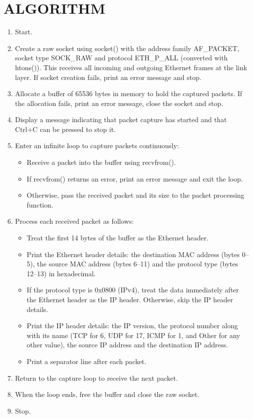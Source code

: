 \documentclass[12pt,a4paper]{article}
\begin{document}
	\section*{ALGORITHM}
\begin{enumerate}
	\item Start.
	\item Create a raw socket using socket() with the address family AF\_PACKET, socket type SOCK\_RAW and protocol ETH\_P\_ALL (converted with htons()). This receives all incoming and outgoing Ethernet frames at the link layer. If socket creation fails, print an error message and stop.
	\item Allocate a buffer of 65536 bytes in memory to hold the captured packets. If the allocation fails, print an error message, close the socket and stop.
	\item Display a message indicating that packet capture has started and that Ctrl+C can be pressed to stop it.
	\item Enter an infinite loop to capture packets continuously:
	\begin{itemize}
		\item Receive a packet into the buffer using recvfrom().
		\item If recvfrom() returns an error, print an error message and exit the loop.
		\item Otherwise, pass the received packet and its size to the packet processing function.
	\end{itemize}
	\item Process each received packet as follows:
	\begin{itemize}
		\item Treat the first 14 bytes of the buffer as the Ethernet header.
		\item Print the Ethernet header details: the destination MAC address (bytes 0--5), the source MAC address (bytes 6--11) and the protocol type (bytes 12--13) in hexadecimal.
		\item If the protocol type is 0x0800 (IPv4), treat the data immediately after the Ethernet header as the IP header. Otherwise, skip the IP header details.
		\item Print the IP header details: the IP version, the protocol number along with its name (TCP for 6, UDP for 17, ICMP for 1, and Other for any other value), the source IP address and the destination IP address.
		\item Print a separator line after each packet.
	\end{itemize}
	\item Return to the capture loop to receive the next packet.
	\item When the loop ends, free the buffer and close the raw socket.
	\item Stop.
\end{enumerate}
	\vspace{-0.9cm}
\end{document}
